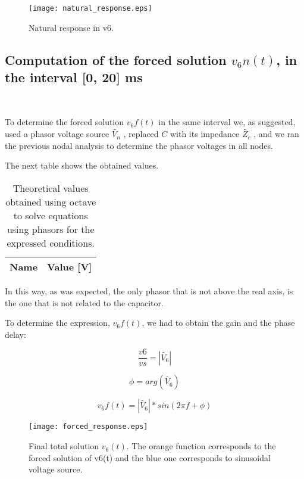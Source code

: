 \begin{figure}[h] \centering
\texttt{[image: natural\_response.eps]}
\caption{Natural response in v6.}
\label{fig:nat}
\end{figure}

\subsection{Computation of the forced solution $v_6n(t)$, in the interval [0, 20] ms}\


To determine the forced solution $v_6f(t)$ in the same interval we, as suggested, used a phasor voltage source $\tilde{V_n}$ , replaced $C$ with its impedance $\tilde{Z_c}$ , and  we ran the previous nodal analysis to determine the phasor voltages in all nodes. 

The next table shows the obtained values.

\begin{table}[h]
  \centering
  \begin{tabular}{|l|r|}
    \hline    
    {\bf Name} & {\bf Value [V]} \\ \hline
    
  \end{tabular}
  \caption{Theoretical values obtained using octave to solve equations using phasors for the expressed conditions.}
  \label{tab:PH}
\end{table}

In this way, as was expected, the only phasor that is not above the real axis, is the one that is not related to the capacitor. 

To determine the expression, $v_6f(t)$, we had to obtain the gain and the phase delay:

\begin{equation}
  \frac{v6}{vs}=|\tilde{V_6}|
\end{equation}

\begin{equation}
  {{\displaystyle \phi }}=arg(\tilde{V_6})
\end{equation}

\begin{equation}
  {v_6f(t)}=|\tilde{V_6}|*sin(2\pi f+ {\displaystyle \phi })
\end{equation}

\begin{figure}[h] \centering
\texttt{[image: forced\_response.eps]}
\caption{Final total solution $v_6(t)$. The orange function corresponds to the forced solution of v6(t) and the blue one corresponds to sinusoidal voltage source. }
\label{fig:forced}
\end{figure}

